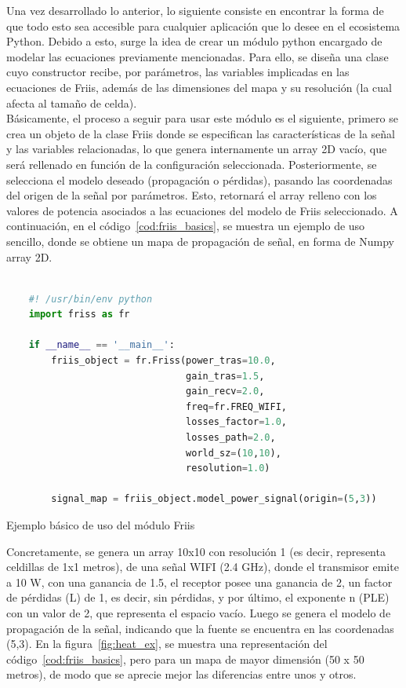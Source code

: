 Una vez desarrollado lo anterior, lo siguiente consiste en encontrar la forma de que todo esto sea accesible para cualquier aplicación que lo desee en el ecosistema Python. Debido a esto, surge la idea de crear un módulo python encargado de modelar las ecuaciones previamente mencionadas. Para ello, se diseña una clase cuyo constructor recibe, por parámetros, las variables implicadas en las ecuaciones de Friis, además de las dimensiones del mapa y su resolución (la cual afecta al tamaño de celda).\\

Básicamente, el proceso a seguir para usar este módulo es el siguiente, primero se crea un objeto de la clase Friis donde se especifican las características de la señal y las variables relacionadas, lo que genera internamente un array 2D vacío, que será rellenado en función de la configuración seleccionada. Posteriormente, se selecciona el modelo deseado (propagación o pérdidas), pasando las coordenadas del origen de la señal por parámetros. Esto, retornará el array relleno con los valores de potencia asociados a las ecuaciones del modelo de Friis seleccionado. A continuación, en el código~\ref{cod:friis_basics}, se muestra un ejemplo de uso sencillo, donde se obtiene un mapa de propagación de señal, en forma de Numpy array 2D.

\begin{code}[H]
    \begin{lstlisting}[language=Python]

    #! /usr/bin/env python
    import friss as fr

    if __name__ == '__main__':
        friis_object = fr.Friss(power_tras=10.0,
                                gain_tras=1.5,
                                gain_recv=2.0,
                                freq=fr.FREQ_WIFI,
                                losses_factor=1.0,
                                losses_path=2.0,
                                world_sz=(10,10),
                                resolution=1.0)

        signal_map = friis_object.model_power_signal(origin=(5,3))

\end{lstlisting}
\caption[Ejemplo básico de uso del módulo Friis]{Ejemplo básico de uso del módulo Friis}
\label{cod:friis_basics}
\end{code}

Concretamente, se genera un array 10x10 con resolución 1 (es decir, representa celdillas de 1x1 metros), de una señal WIFI (2.4 GHz), donde el transmisor emite a 10 W, con una ganancia de 1.5, el receptor posee una ganancia de 2, un factor de pérdidas (L) de 1, es decir, sin pérdidas, y por último, el exponente n (\ac{PLE}) con un valor de 2, que representa el espacio vacío. Luego se genera el modelo de propagación de la señal, indicando que la fuente se encuentra en las coordenadas (5,3). En la figura~\ref{fig:heat_ex}, se muestra una representación del código~\ref{cod:friis_basics}, pero para un mapa de mayor dimensión (50 x 50 metros), de modo que se aprecie mejor las diferencias entre unos y otros.\\

